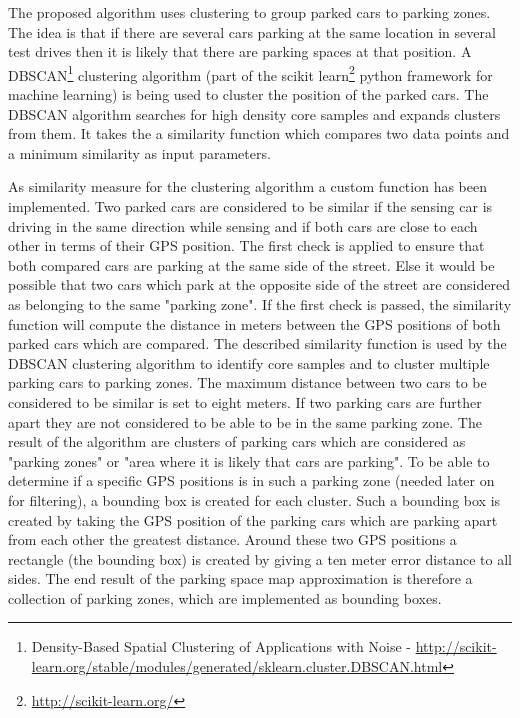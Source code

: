 The proposed algorithm uses clustering to group parked cars to parking zones. The idea is that if there are several cars parking at the same location in several test drives then it is likely that there are parking spaces at that position. A DBSCAN\footnote{Density-Based Spatial Clustering of Applications with Noise - \url{http://scikit-learn.org/stable/modules/generated/sklearn.cluster.DBSCAN.html}} clustering algorithm (part of the scikit learn\footnote{\url{http://scikit-learn.org/}} python framework for machine learning) is being used to cluster the position of the parked cars. The DBSCAN algorithm searches for high density core samples and expands clusters from them. It takes the a similarity function which compares two data points and a minimum similarity as input parameters.

As similarity measure for the clustering algorithm a custom function has been implemented. Two parked cars are considered to be similar if the sensing car is driving in the same direction while sensing and if both cars are close to each other in terms of their GPS position. The first check is applied to ensure that both compared cars are parking at the same side of the street. Else it would be possible that two cars which park at the opposite side of the street are considered as belonging to the same "parking zone". If the first check is passed, the similarity function will compute the distance in meters between the GPS positions of both parked cars which are compared. The described similarity function is used by the DBSCAN clustering algorithm to identify core samples and to cluster multiple parking cars to parking zones. The maximum distance between two cars to be considered to be similar is set to eight meters. If two parking cars are further apart they are not considered to be able to be in the same parking zone. 
The result of the algorithm are clusters of parking cars which are considered as "parking zones" or "area where it is likely that cars are parking". To be able to determine if a specific GPS positions is in such a parking zone (needed later on for filtering), a bounding box is created for each cluster. Such a bounding box is created by taking the GPS position of the parking cars which are parking apart from each other the greatest distance. Around these two GPS positions a rectangle (the bounding box) is created by giving a ten meter error distance to all sides. The end result of the parking space map approximation is therefore a collection of parking zones, which are implemented as bounding boxes.

